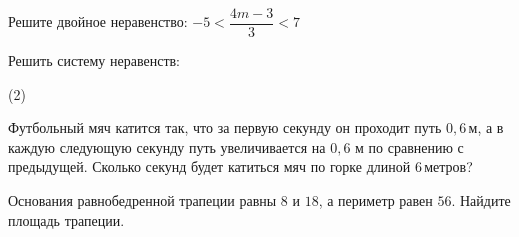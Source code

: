 \begin{homework}[number=2]
	\begin{listofex}
		\item {}
		\item Решите двойное неравенство: \( -5<\dfrac{4m-3}{3}<7 \)
		\item Решить систему неравенств:
		\begin{tasks}(2)
			\task {}
			\task {}
		\end{tasks}
		\item Футбольный мяч катится так, что за первую секунду он проходит путь \( 0,6 \) м, а в каждую следующую секунду путь увеличивается на \( 0,6  \) м по сравнению с предыдущей. Сколько секунд будет катиться мяч по горке длиной 6 метров?
		\item Основания равнобедренной трапеции равны \( 8 \) и \( 18 \), а периметр равен \( 56 \).	Найдите площадь трапеции.
	\end{listofex}
\end{homework}
%
%
